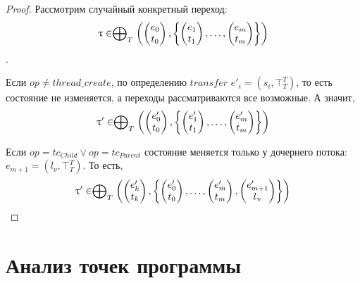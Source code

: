 \begin{proof}
Рассмотрим случайный конкретный переход:
$$\uptau \in  \mathrel{\bigoplus}_{T}
\left(
\begin{pmatrix}
e_0 \\
t_0 
\end{pmatrix},
\left\{
\begin{pmatrix}
e_1 \\
t_1 
\end{pmatrix},
\dots ,
\begin{pmatrix}
e_m \\
t_m 
\end{pmatrix}
\right\}
\right)$$.

Если $op \neq thread\_create$, по определению $transfer$ $e'_i = (s_i, \top^T_T)$, то есть состояние не изменяется, а переходы рассматриваются все возможные. 
А значит, 
$$\uptau' \in  \mathrel{\bigoplus}_{T}
\left(
\begin{pmatrix}
e'_0 \\
t_0 
\end{pmatrix},
\left\{
\begin{pmatrix}
e'_1 \\
t_1 
\end{pmatrix},
\dots ,
\begin{pmatrix}
e'_m \\
t_m 
\end{pmatrix}
\right\}
\right)$$

Если $op = tc_{Child} \lor op = tc_{Parent}$ состояние меняется только у дочернего потока: $e_{m+1} = (l_{\nu}, \top^T_T)$.
То есть, 
$$\uptau' \in  \mathrel{\bigoplus}_{T}
\left(
\begin{pmatrix}
e'_k \\
t_k 
\end{pmatrix},
\left\{
\begin{pmatrix}
e'_0 \\
t_0 
\end{pmatrix},
\dots ,
\begin{pmatrix}
e'_m \\
t_m 
\end{pmatrix} ,
\begin{pmatrix}
e'_{m+1} \\
l_{\upnu} 
\end{pmatrix}
\right\}
\right)$$

\end{proof}
\section{Анализ точек программы}
\label{sect_location_analysis}

